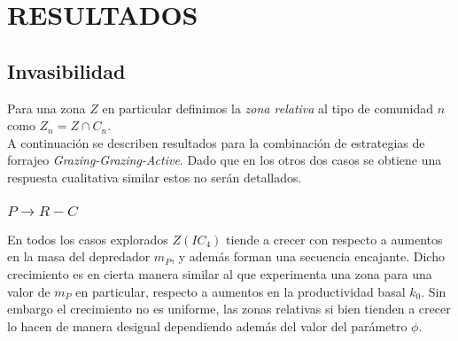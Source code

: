 \section{RESULTADOS}

\subsection{Invasibilidad}

Para una zona $Z$ en particular definimos la \emph{zona relativa} al tipo de comunidad $n$ como $Z_n = Z \cap C_n$. \\
A continuaci\'on se describen resultados para la combinaci\'on de estrategias de forrajeo \emph{Grazing-Grazing-Active}. Dado que en los otros dos casos se obtiene una respuesta cualitativa similar estos no ser\'an detallados.

\subsubsection{$ P \to R-C$}

En todos los casos explorados $Z(IC_4)$ tiende a crecer con respecto a aumentos en la masa del depredador $m_P$, y adem\'as forman una secuencia encajante. Dicho crecimiento es en cierta manera similar al que experimenta una zona para una valor de $m_P$ en particular, respecto a aumentos en la productividad basal $k_0$. Sin embargo el crecimiento no es uniforme, las zonas relativas si bien tienden a crecer lo hacen de manera desigual dependiendo adem\'as del valor del par\'ametro $\phi$.\\

